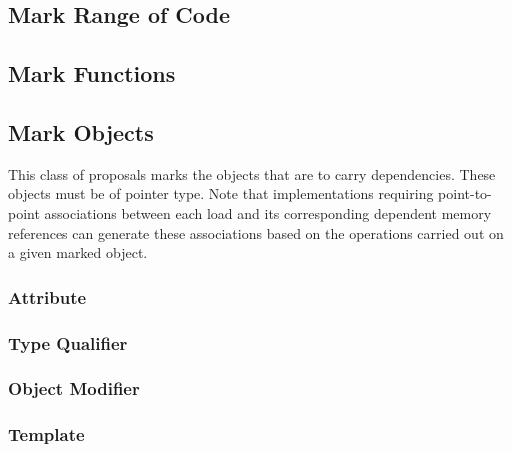 \documentclass[letterpaper,twocolumn,10pt]{article}
\begin{document}


\subsection{Mark Range of Code}
\label{sec:Mark Range of Code}



\subsection{Mark Functions}
\label{sec:Mark Functions}



\subsection{Mark Objects}
\label{sec:Mark Objects}

This class of proposals marks the objects that are to carry dependencies.
These objects must be of pointer type.
Note that implementations requiring point-to-point associations between
each  load and its corresponding dependent
memory references can generate these associations based on the
operations carried out on a given marked object.

\subsubsection{Attribute}
\label{sec:Attribute}



\subsubsection{Type Qualifier}
\label{sec:Type Qualifier}



\subsubsection{Object Modifier}
\label{sec:Object Modifier}



\subsubsection{Template}
\label{sec:Template}


\end{document}
